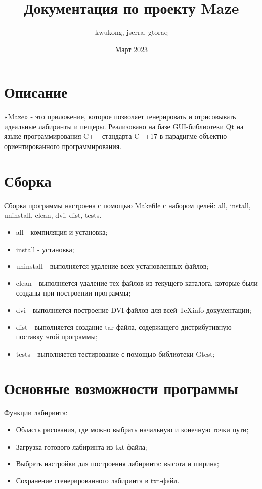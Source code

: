 \documentclass[11pt, letterpaper]{article}
\title{Документация по проекту Maze}
\author{kwukong, jserra, gtoraq}
\date{Март 2023}
\begin{document}
\maketitle

\pagebreak

\section*{Описание}
«Maze» -  это приложение, которое позволяет генерировать и отрисовывать идеальные лабиринты и пещеры. Реализовано на базе GUI-библиотеки Qt на языке программирования C++ стандарта C++17 в парадигме объектно-ориентированного программирования.

\section{Сборка}
Сборка программы настроена с помощью Makefile с набором целей: all, install, uninstall, clean, dvi, dist, tests.

\begin{itemize}
	\item all - компиляция и установка;
	\item install - установка;
	\item uninstall - выполняется удаление всех установленных файлов;
	\item clean - выполняется удаление тех файлов из текущего каталога, которые были созданы при построении программы;
	\item dvi - выполняется построение DVI-файлов для всей TeXinfo-документации;
	\item dist - выполняется создание tar-файла, содержащего дистрибутивную поставку этой программы;
	\item tests - выполняется тестирование с помощью библиотеки Gtest;
\end{itemize}


\section{Основные возможности программы}
Функции лабиринта:

\begin{itemize}
	\item Область рисования, где можно выбрать начальную и конечную точки пути;
	\item Загрузка готового лабиринта из txt-файла;
	\item Выбрать настройки для построения лабиринта: высота и ширина;
	\item Сохранение сгенерированного лабиринта в txt-файл.
\end{itemize}
\end{document}
